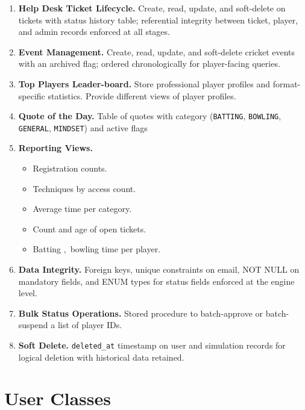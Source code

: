 \documentclass[12pt,a4paper]{article}
\begin{document}
\begin{enumerate}[leftmargin=1.5em, itemsep=4pt]
    \item \textbf{Help Desk Ticket Lifecycle.}
   Create, read, update, and soft-delete on tickets with status history table; referential integrity
    between ticket, player, and admin records enforced at all stages.

    \item \textbf{Event Management.}
    Create, read, update, and soft-delete cricket events with an archived
    flag; ordered chronologically for player-facing queries.

    \item \textbf{Top Players Leader-board.}
    Store professional player profiles and format-specific statistics.
    Provide  different views of player profiles.

    \item \textbf{Quote of the Day.}
    Table of  quotes with category (\texttt{BATTING},
    \texttt{BOWLING}, \texttt{GENERAL}, \texttt{MINDSET}) and active flags

    \item \textbf{Reporting Views.}
    \begin{itemize}[leftmargin=1.2em]
        \item  Registration counts.
        \item  Techniques by access count.
        \item Average time per category.
        \item  Count and age of open tickets.
        \item Batting ,\ bowling time per player.
    \end{itemize}

    \item \textbf{Data Integrity.}
    Foreign keys, unique constraints on email, NOT NULL on mandatory fields,
    and ENUM types for status fields enforced at the engine level.

    \item \textbf{Bulk Status Operations.}
    Stored procedure to batch-approve or batch-suspend a list of player IDs.

    \item \textbf{Soft Delete.}
    \texttt{deleted\_at} timestamp on user and simulation records for
    logical deletion with historical data retained.

\end{enumerate}

\section{User Classes}
\end{document}
